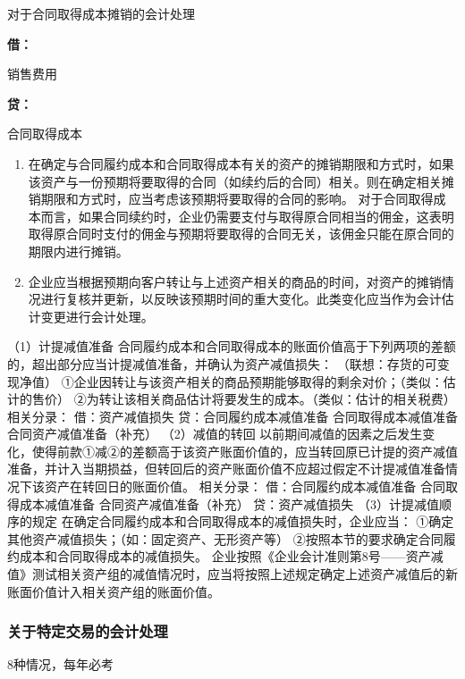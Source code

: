 \documentclass[UTF8,12pt]{ctexart}
\newenvironment{Dr}{%
	\begin{list}{}%
		{
			\setlength{\leftmargin}{2em}
			\setlength{\labelwidth}{2em}
			\setlength{\labelsep}{0pt}
			\setlength{\itemindent}{0pt}
			\setlength{\listparindent}{0pt}
			\setlength{\parsep}{0pt}
			\setlength{\topsep}{0pt}
		}
		\item[\textbf{借：}]
	}{%
	\end{list}
}
\newenvironment{Cr}{%
	\begin{list}{}%
		{
			\setlength{\leftmargin}{2em}
			\setlength{\labelwidth}{2em}
			\setlength{\labelsep}{0pt}
			\setlength{\itemindent}{0pt}
			\setlength{\listparindent}{0pt}
			\setlength{\parsep}{0pt}
			\setlength{\topsep}{0pt}
		}
		\item[\textbf{贷：}]
	}{%
	\end{list}
}
\numberwithin{equation}{section} %
\numberwithin{figure}{section}
\numberwithin{table}{section}
\begin{document}
	对于合同取得成本摊销的会计处理
	\begin{Dr}
		销售费用
	\end{Dr}
	\begin{Cr}
		合同取得成本
	\end{Cr}

	\begin{enumerate}
		\item 在确定与合同履约成本和合同取得成本有关的资产的摊销期限和方式时，如果该资产与一份预期将要取得的合同（如续约后的合同）相关。则在确定相关摊销期限和方式时，应当考虑该预期将要取得的合同的影响。
		对于合同取得成本而言，如果合同续约时，企业仍需要支付与取得原合同相当的佣金，这表明取得原合同时支付的佣金与预期将要取得的合同无关，该佣金只能在原合同的期限内进行摊销。
		
		\item 企业应当根据预期向客户转让与上述资产相关的商品的时间，对资产的摊销情况进行复核并更新，以反映该预期时间的重大变化。此类变化应当作为会计估计变更进行会计处理。
	\end{enumerate}
	
	（1）计提减值准备
	合同履约成本和合同取得成本的账面价值高于下列两项的差额的，超出部分应当计提减值准备，并确认为资产减值损失：
	（联想：存货的可变现净值）
	①企业因转让与该资产相关的商品预期能够取得的剩余对价；（类似：估计的售价）
	②为转让该相关商品估计将要发生的成本。（类似：估计的相关税费）
	相关分录：
	借：资产减值损失
	贷：合同履约成本减值准备
	合同取得成本减值准备
	合同资产减值准备（补充） 
	（2）减值的转回
	以前期间减值的因素之后发生变化，使得前款①减②的差额高于该资产账面价值的，应当转回原已计提的资产减值准备，并计入当期损益，但转回后的资产账面价值不应超过假定不计提减值准备情况下该资产在转回日的账面价值。
	相关分录：
	借：合同履约成本减值准备
	合同取得成本减值准备
	合同资产减值准备（补充）
	贷：资产减值损失 
	（3）计提减值顺序的规定
	在确定合同履约成本和合同取得成本的减值损失时，企业应当：
	①确定其他资产减值损失；（如：固定资产、无形资产等）
	②按照本节的要求确定合同履约成本和合同取得成本的减值损失。
	企业按照《企业会计准则第8号——资产减值》测试相关资产组的减值情况时，应当将按照上述规定确定上述资产减值后的新账面价值计入相关资产组的账面价值。
	
	
	\subsubsection{关于特定交易的会计处理}
	8种情况，每年必考
\end{document}
